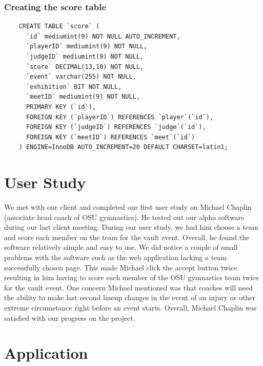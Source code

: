 \documentclass[letterpaper,10pt,draftclsnofoot,onecolumn,]{article}
\begin{document}
\subsubsection{Creating the score table}
\begin{verbatim}
    CREATE TABLE `score` (
      `id` mediumint(9) NOT NULL AUTO_INCREMENT,
      `playerID` mediumint(9) NOT NULL,
      `judgeID` mediumint(9) NOT NULL,
      `score` DECIMAL(13,10) NOT NULL,
      `event` varchar(255) NOT NULL,
      `exhibition` BIT NOT NULL,
      `meetID` mediumint(9) NOT NULL,
      PRIMARY KEY (`id`),
      FOREIGN KEY (`playerID`) REFERENCES `player`(`id`),
      FOREIGN KEY (`judgeID`) REFERENCES `judge`(`id`),
      FOREIGN KEY (`meetID`) REFERENCES `meet`(`id`)
    ) ENGINE=InnoDB AUTO_INCREMENT=20 DEFAULT CHARSET=latin1;
\end{verbatim}

\section{User Study}
We met with our client and completed our first user study on Michael Chaplin (associate head coach of OSU gymnastics). He tested out our alpha software during our last client meeting. During our user study, we had him choose a team and score each member on the team for the vault event. Overall, he found the software relatively simple and easy to use. We did notice a couple of small problems with the software such as the web application lacking a team successfully chosen page. This made Michael click the accept button twice resulting in him having to score each member of the OSU gymnastics team twice for the vault event. One concern Michael mentioned was that coaches will need the ability to make last second lineup changes in the event of an injury or other extreme circumstance right before an event starts. Overall, Michael Chaplin was satisfied with our progress on the project.

\section{Application}
\end{document}
